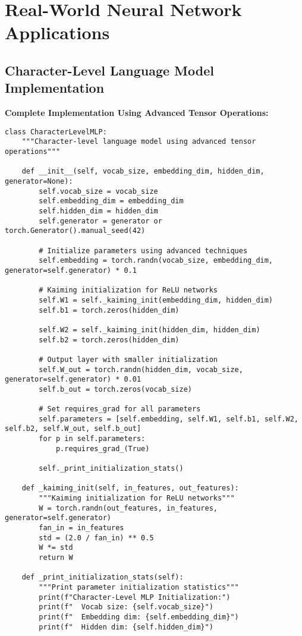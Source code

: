 \documentclass[11pt,a4paper]{book}
\begin{document}
\section{Real-World Neural Network Applications}

\subsection{Character-Level Language Model Implementation}

\textbf{Complete Implementation Using Advanced Tensor Operations:}
\begin{verbatim}
class CharacterLevelMLP:
    """Character-level language model using advanced tensor operations"""
    
    def __init__(self, vocab_size, embedding_dim, hidden_dim, generator=None):
        self.vocab_size = vocab_size
        self.embedding_dim = embedding_dim
        self.hidden_dim = hidden_dim
        self.generator = generator or torch.Generator().manual_seed(42)
        
        # Initialize parameters using advanced techniques
        self.embedding = torch.randn(vocab_size, embedding_dim, generator=self.generator) * 0.1
        
        # Kaiming initialization for ReLU networks
        self.W1 = self._kaiming_init(embedding_dim, hidden_dim)
        self.b1 = torch.zeros(hidden_dim)
        
        self.W2 = self._kaiming_init(hidden_dim, hidden_dim)
        self.b2 = torch.zeros(hidden_dim)
        
        # Output layer with smaller initialization
        self.W_out = torch.randn(hidden_dim, vocab_size, generator=self.generator) * 0.01
        self.b_out = torch.zeros(vocab_size)
        
        # Set requires_grad for all parameters
        self.parameters = [self.embedding, self.W1, self.b1, self.W2, self.b2, self.W_out, self.b_out]
        for p in self.parameters:
            p.requires_grad_(True)
        
        self._print_initialization_stats()
    
    def _kaiming_init(self, in_features, out_features):
        """Kaiming initialization for ReLU networks"""
        W = torch.randn(out_features, in_features, generator=self.generator)
        fan_in = in_features
        std = (2.0 / fan_in) ** 0.5
        W *= std
        return W
    
    def _print_initialization_stats(self):
        """Print parameter initialization statistics"""
        print(f"Character-Level MLP Initialization:")
        print(f"  Vocab size: {self.vocab_size}")
        print(f"  Embedding dim: {self.embedding_dim}")
        print(f"  Hidden dim: {self.hidden_dim}")
        

\end{verbatim}
\end{document}
